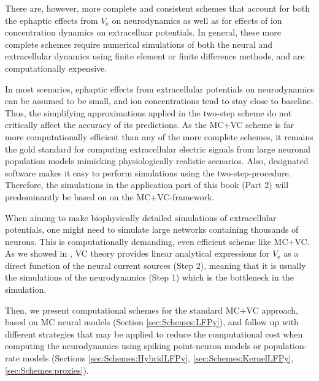 There are, however, more complete and consistent schemes that account for both the ephaptic effects from $V_\text{e}$  on neurodynamics as well as for effects of ion concentration dynamics on extracelluar potentials. 
In general, these more complete schemes require numerical simulations of both the neural and extracellular dynamics using finite element or finite difference methods, and are computationally expensive.

In most scenarios, ephaptic effects from extracellular potentials on neurodynamics can be assumed to be small, and ion concentrations tend to stay close to baseline. Thus, the simplifying approximations applied in the two-step scheme do not critically affect the accuracy of its predictions. As the MC+VC scheme is far more computationally efficient than any of the more complete schemes, it remains the gold standard for computing extracellular electric signals from large neuronal population models mimicking physiologically realistic scenarios. Also, designated software makes it easy to perform simulations using the two-step-procedure. Therefore, the simulations in the application part of this book (Part 2) will predominantly be based on on the MC+VC-framework.

When aiming to make biophysically detailed simulations of extracellular potentials, one might need to simulate large networks containing thousands of neurons. 
This is computationally demanding, even  efficient scheme like MC+VC.
 As we showed in , VC theory provides linear analytical expressions for $V_\text{e}$  as a direct function of the neural current sources (Step 2), meaning that it is usually the simulations of the neurodynamics (Step 1) which is the bottleneck in the simulation. 

Then, we present computational schemes for the standard MC+VC approach, based on MC neural models (Section \ref{sec:Schemes:LFPy}), and follow up with different strategies that may be applied to reduce the computational cost when computing the neurodynamics using spiking point-neuron models or population-rate models (Sections \ref{sec:Schemes:HybridLFPy}, \ref{sec:Schemes:KernelLFPy}, \ref{sec:Schemes:proxies}). 

